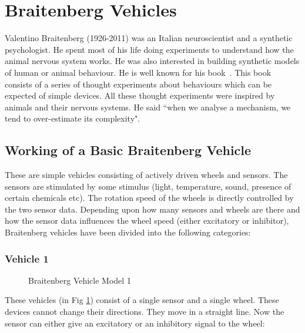 \section{Braitenberg Vehicles}

    Valentino Braitenberg (1926-2011) was an Italian neuroscientist and a synthetic psychologist. He spent most of his life doing experiments to understand how the animal nervous system works. He was also interested in building synthetic models of human or animal behaviour. He is well known for his book~\cite{braitenberg1986vehicles}. This book consists of a series of thought experiments about behaviours which can be expected of simple devices. All these thought experiments were inspired by animals and their nervous systems. He said ``when we analyse a mechanism, we tend to over-estimate its complexity".

    \subsection{Working of a Basic Braitenberg Vehicle}
    These are simple vehicles consisting of actively driven wheels and sensors. The sensors are stimulated by some stimulus (light, temperature, sound, presence of certain chemicals etc). The rotation speed of the wheels is directly controlled by the two sensor data. Depending upon how many sensors and wheels are there and how the sensor data influences the wheel speed (either excitatory or inhibitor), Braitenberg vehicles have been divided into the following categories:



    \subsubsection{Vehicle 1}
    \label{sec:Vehicle_1}

        \begin{figure}[t]%
            \centering
            \qquad
            \caption{Braitenberg Vehicle Model 1}%
            \label{fig:vehicle1}%
        \end{figure}

        These vehicles (in Fig \ref{fig:vehicle1}) consist of a single sensor and a single wheel. These devices cannot change their directions. They move in a straight line. Now the sensor can either give an excitatory or an inhibitory signal to the wheel:

